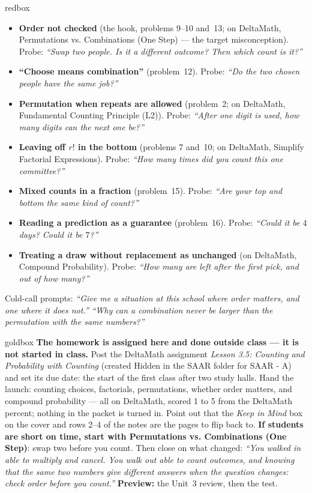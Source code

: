 \documentclass[10pt]{article}
\begin{document}
\boxguard
\begin{skillbox}{redbox}
\begin{itemize}[leftmargin=1.2em, nosep]
  \item \textbf{Order not checked} (the hook, problems 9--10 and~13; on DeltaMath,
        Permutations vs. Combinations (One Step) --- the target misconception). Probe:
        \emph{``Swap two people. Is it a different outcome? Then which count is it?''}
  \item \textbf{``Choose means combination''} (problem~12). Probe: \emph{``Do the two
        chosen people have the same job?''}
  \item \textbf{Permutation when repeats are allowed} (problem~2; on DeltaMath, Fundamental
        Counting Principle (L2)). Probe: \emph{``After one digit is used, how many digits can
        the next one be?''}
  \item \textbf{Leaving off $r!$ in the bottom} (problems 7 and~10; on DeltaMath, Simplify
        Factorial Expressions). Probe: \emph{``How many times did you count this one
        committee?''}
  \item \textbf{Mixed counts in a fraction} (problem~15). Probe: \emph{``Are your top
        and bottom the same kind of count?''}
  \item \textbf{Reading a prediction as a guarantee} (problem~16). Probe: \emph{``Could
        it be $4$ days? Could it be $7$?''}
  \item \textbf{Treating a draw without replacement as unchanged} (on DeltaMath, Compound
        Probability). Probe: \emph{``How many are left after the first pick, and out of how
        many?''}
\end{itemize}
Cold-call prompts: \emph{``Give me a situation at this school where order matters, and one
where it does not.''} \quad \emph{``Why can a combination never be larger than the permutation
with the same numbers?''}
\end{skillbox}

\boxguard
\begin{skillbox}{goldbox}
\textbf{The homework is assigned here and done outside class --- it is not started in class.}
Post the DeltaMath assignment \emph{Lesson 3.5: Counting and Probability with Counting} (created
Hidden in the SAAR folder for SAAR - A) and set its due date: the start of the first class
after two study halls. Hand the launch: counting choices, factorials, permutations, whether
order matters, and compound probability --- all on DeltaMath, scored 1 to 5 from the DeltaMath
percent; nothing in the packet is turned in. Point out that the \emph{Keep in Mind} box on the
cover and rows 2--4 of the notes are the pages to flip back to. \textbf{If students are short
on time, start with Permutations vs. Combinations (One Step)}: swap two before you count.
Then close on what changed: \emph{``You walked
in able to multiply and cancel. You walk out able to count outcomes, and knowing that the same
two numbers give different answers when the question changes: check order before you count.''}
\textbf{Preview:} the Unit~3 review, then the test.
\end{skillbox}
\end{document}
